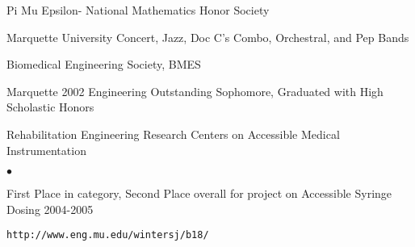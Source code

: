 \documentclass[margin,line]{res}
\newenvironment{list2}{
  \begin{list}{$\bullet$}{%
      \setlength{\itemsep}{0in}
      \setlength{\parsep}{0in} \setlength{\parskip}{0in}
      \setlength{\topsep}{0in} \setlength{\partopsep}{0in} 
      \setlength{\leftmargin}{0.2in}}}{\end{list}}
\begin{document}
\begin{resume}
Pi Mu Epsilon- National Mathematics Honor Society

Marquette University Concert, Jazz, Doc C's Combo, Orchestral, and Pep Bands

Biomedical Engineering Society, BMES

Marquette 2002 Engineering Outstanding Sophomore, Graduated with High Scholastic Honors

Rehabilitation Engineering Research Centers on Accessible Medical Instrumentation
\begin{list2}
 \item First Place in category, Second Place overall for project on Accessible Syringe Dosing 2004-2005
 \item \begin{verbatim}http://www.eng.mu.edu/wintersj/b18/\end{verbatim}
\end{list2}
%



\end{resume}
\end{document}
